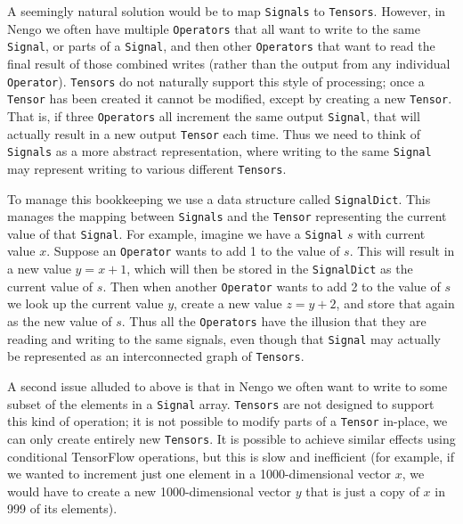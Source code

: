 \documentclass{article}
\begin{document}
A seemingly natural solution would be to map \texttt{Signals} to \texttt{Tensors}.  However, in Nengo we often have multiple \texttt{Operators} that all want to write to the same \texttt{Signal}, or parts of a \texttt{Signal}, and then other \texttt{Operators} that want to read the final result of those combined writes (rather than the output from any individual \texttt{Operator}).  \texttt{Tensors} do not naturally support this style of processing; once a \texttt{Tensor} has been created it cannot be modified, except by creating a new \texttt{Tensor}.  That is, if three \texttt{Operators} all increment the same output \texttt{Signal}, that will actually result in a new output \texttt{Tensor} each time.  Thus we need to think of \texttt{Signals} as a more abstract representation, where writing to the same \texttt{Signal} may represent writing to various different \texttt{Tensors}.

To manage this bookkeeping we use a data structure called \texttt{SignalDict}.  This manages the mapping between \texttt{Signals} and the \texttt{Tensor} representing the current value of that \texttt{Signal}.  For example, imagine we have a \texttt{Signal} $s$ with current value $x$.  Suppose an \texttt{Operator} wants to add 1 to the value of $s$.  This will result in a new value $y = x + 1$, which will then be stored in the \texttt{SignalDict} as the current value of $s$.  Then when another \texttt{Operator} wants to add 2 to the value of $s$ we look up the current value $y$, create a new value $z = y + 2$, and store that again as the new value of $s$.  Thus all the \texttt{Operators} have the illusion that they are reading and writing to the same signals, even though that \texttt{Signal} may actually be represented as an interconnected graph of \texttt{Tensors}.

A second issue alluded to above is that in Nengo we often want to write to some subset of the elements in a \texttt{Signal} array.  \texttt{Tensors} are not designed to support this kind of operation; it is not possible to modify parts of a \texttt{Tensor} in-place, we can only create entirely new \texttt{Tensors}.  It is possible to achieve similar effects using conditional TensorFlow operations, but this is slow and inefficient (for example, if we wanted to increment just one element in a 1000-dimensional vector $x$, we would have to create a new 1000-dimensional vector $y$ that is just a copy of $x$ in 999 of its elements).
\end{document}
